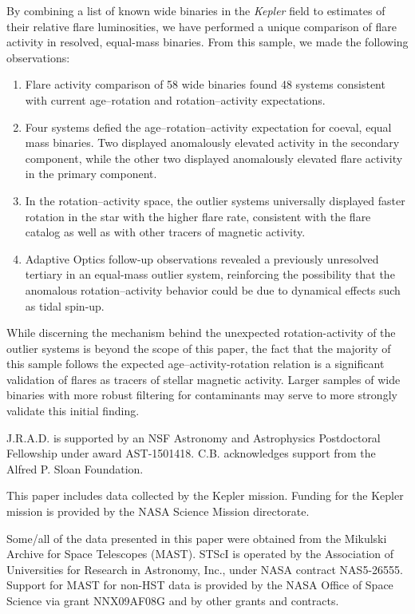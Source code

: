 \documentclass[preprint2]{aastex61}
\newcommand{\Kepler}{\textsl{Kepler}\xspace}
\begin{document}
By combining a list of known wide binaries in the \Kepler field to estimates of their relative flare luminosities, we have performed a unique comparison of flare activity in resolved, equal-mass binaries. From this sample, we made the following observations:

\begin{enumerate} 
\item{Flare activity comparison of 58 wide binaries found 48 systems consistent with current age--rotation and rotation--activity expectations.}
\item{Four systems defied the age--rotation--activity expectation for coeval, equal mass binaries. Two displayed anomalously elevated activity in the secondary component, while the other two displayed anomalously elevated flare activity in the primary component.}
\item{In the rotation--activity space, the outlier systems universally displayed faster rotation in the star with the higher flare rate, consistent with the \citet{davenport2016} flare catalog as well as with other tracers of magnetic activity.}
\item{Adaptive Optics follow-up observations revealed a previously unresolved tertiary in an equal-mass outlier system, reinforcing the possibility that the anomalous rotation--activity behavior could be due to dynamical effects such as tidal spin-up.}
\end{enumerate} 

While discerning the mechanism behind the unexpected rotation-activity of the outlier systems is beyond the scope of this paper, the fact that the majority of this sample follows the expected age--activity-rotation relation is a significant validation of flares as tracers of stellar magnetic activity. Larger samples of wide binaries with more robust filtering for contaminants may serve to more strongly validate this initial finding.

\acknowledgements

J.R.A.D. is supported by an NSF Astronomy and Astrophysics Postdoctoral Fellowship under award AST-1501418. C.B. acknowledges support from the Alfred P. Sloan Foundation.

This paper includes data collected by the Kepler mission. Funding for the Kepler mission is provided by the NASA Science Mission directorate. 

Some/all of the data presented in this paper were obtained from the Mikulski Archive for Space Telescopes (MAST). STScI is operated by the Association of Universities for Research in Astronomy, Inc., under NASA contract NAS5-26555. Support for MAST for non-HST data is provided by the NASA Office of Space Science via grant NNX09AF08G and by other grants and contracts. 
\end{document}
